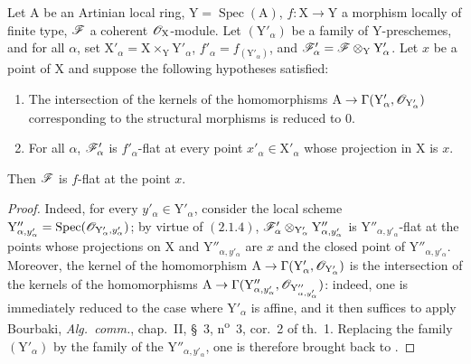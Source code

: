 \begin{corollary}[11.4.13]
\label{IV.11.4.13}
Let $\mathrm{A}$ be an Artinian local ring, $\mathrm{Y}=\operatorname{Spec}(\mathrm{A})$, $f:\mathrm{X}\to\mathrm{Y}$ a
morphism locally of finite type, $\mathscr{F}$ a coherent $\mathscr{O}_\mathrm{X}$-module. Let $(\mathrm{Y}'_\alpha)$ be a family of
$\mathrm{Y}$-preschemes, and for all $\alpha$, set $\mathrm{X}'_\alpha=\mathrm{X}\times_\mathrm{Y}\mathrm{Y}'_\alpha$, $f'_\alpha=f_{(\mathrm{Y}'_\alpha)}$, and $\mathscr{F}'_\alpha=\mathscr{F}\otimes_\mathrm{Y}\mathrm{Y}'_\alpha$. Let $x$ be a point
of $\mathrm{X}$ and suppose the following hypotheses satisfied:
\begin{enumerate}[label=(\roman*)]
  \item The intersection of the kernels of the homomorphisms $\mathrm{A}\to\Gamma(\mathrm{Y}'_\alpha,\mathscr{O}_{\mathrm{Y}'_\alpha})$ corresponding to the
  structural morphisms is reduced to $0$.
  \item For all $\alpha$, $\mathscr{F}'_\alpha$ is $f'_\alpha$-flat at every point $x'_\alpha\in\mathrm{X}'_\alpha$ whose projection in $\mathrm{X}$ is $x$.
\end{enumerate}

Then $\mathscr{F}$ is $f$-flat at the point $x$.
\end{corollary}

\begin{proof}
Indeed, for every $y'_\alpha\in\mathrm{Y}'_\alpha$, consider the local scheme
$\mathrm{Y}''_{\alpha,y'_\alpha}=\operatorname{Spec}(\mathscr{O}_{\mathrm{Y}'_\alpha,y'_\alpha})$; by
virtue of $(2.1.4)$, $\mathscr{F}'_\alpha\otimes_{\mathrm{Y}'_\alpha}\mathrm{Y}''_{\alpha,y'_\alpha}$ is
$\mathrm{Y}''_{\alpha,y'_\alpha}$-flat at the points whose projections on $\mathrm{X}$ and
$\mathrm{Y}''_{\alpha,y'_\alpha}$ are $x$ and the closed point of $\mathrm{Y}''_{\alpha,y'_\alpha}$.
Moreover, the kernel of the homomorphism
$\mathrm{A}\to\Gamma(\mathrm{Y}'_\alpha,\mathscr{O}_{\mathrm{Y}'_\alpha})$ is the intersection of the kernels of the homomorphisms
$\mathrm{A}\to\Gamma(\mathrm{Y}''_{\alpha,y'_\alpha},\mathscr{O}_{\mathrm{Y}''_{\alpha,y'_\alpha}})$:
indeed, one is immediately reduced to the case where $\mathrm{Y}'_\alpha$ is affine, and it then suffices to apply Bourbaki, \emph{Alg.\ comm.},
chap.~II, \S~3, n\textsuperscript{o}~3, cor.~2 of th.~1. Replacing the family $(\mathrm{Y}'_\alpha)$ by the family of the $\mathrm{Y}''_{\alpha,y'_\alpha}$,
one is therefore brought back to .
\end{proof}

